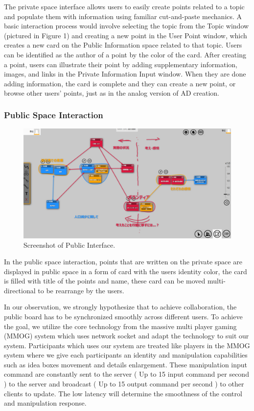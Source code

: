 \documentclass{sigchi}
\begin{document}
\begin{itemize}
The private space interface allows users to easily create points related to a topic and populate them with information using familiar cut-and-paste mechanics. A basic interaction process would involve selecting the topic from the Topic window (pictured in Figure 1) and creating a new point in the User Point window, which creates a new card on the Public Information space related to that topic. Users can be identified as the author of a point by the color of the card. After creating a point, users can illustrate their point by adding supplementary information, images, and links in the Private Information Input window. When they are done adding information, the card is complete and they can create a new point, or browse other users' points, just as in the analog version of AD creation.

\subsubsection{Public Space Interaction}

\begin{figure}[!h]
\centering
\includegraphics[width=1.0\columnwidth]{public1}
\caption{Screenshot of Public Interface.}
\label{fig:figure1}
\end{figure}
In the public space interaction, points that are written on the private space are displayed in public space in a form of card with the users identity color, the card is filled with title of the points and name, these card can be moved multi-directional to be rearrange by the users.

In our observation, we strongly hypothesize that to achieve collaboration, the public board has to be synchronized smoothly across different users. To achieve the goal, we utilize the core technology from the massive multi player gaming (MMOG) system which uses network socket and adapt the technology to suit our system. Participants which uses our system are treated like players in the MMOG system where we give each participants an identity and manipulation capabilities such as idea boxes movement and details enlargement. These manipulation input command are constantly sent to the server ( Up to 15 input command per second )  to the server and broadcast ( Up to 15 output command per second ) to other clients to update.  The low latency will determine the smoothness of the control and manipulation response. 



\end{itemize}
\end{document}
